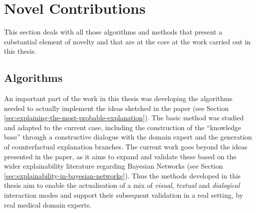 \section{Novel Contributions}\label{sec:novel-contributions}
This section deals with all those algorithms and methods that present a substantial element of novelty and that are at the core at the work carried out in this thesis.

\subsection{Algorithms} \label{subsec:algorithms-novel}
An important part of the work in this thesis was developing the algorithms needed to actually implement the ideas sketched in the paper \citep{Butz2018} (see Section \ref{sec:explaining-the-most-probable-explanation}).
The basic method was studied and adapted to the current case, including the construction of the \enquote{knowledge base} through a constructive dialogue with the domain expert and the generation of counterfactual explanation branches.
The current work goes beyond the ideas presented in the paper, as it aims to expand and validate these based on the wider explainability literature regarding Bayesian Networks (see Section \ref{sec:explainability-in-bayesian-networks}).
Thus the methods developed in this thesis aim to enable the actualisation of a mix of \textit{visual}, \textit{textual} and \textit{dialogical} interaction modes and support their subsequent validation in a real setting, by real medical domain experts.

